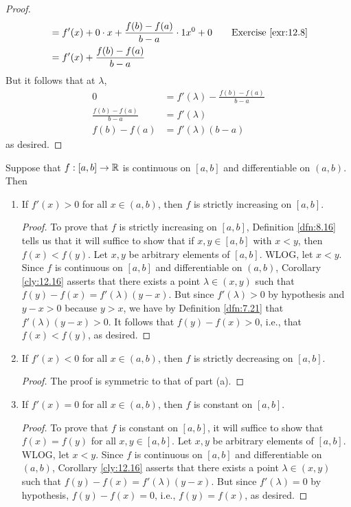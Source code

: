 \documentclass[../main.tex]{subfiles}
\begin{document}
\begin{corollary}
\begin{proof}
\begin{align*}
            &= f'(x)+0\cdot x+\frac{f(b)-f(a)}{b-a}\cdot 1x^0+0\tag*{Exercise \ref{exr:12.8}}\\
            &= f'(x)+\frac{f(b)-f(a)}{b-a}
        \end{align*}
        But it follows that at $\lambda$,
        \begin{align*}
            0 &= f'(\lambda)-\frac{f(b)-f(a)}{b-a}\\
            \frac{f(b)-f(a)}{b-a} &= f'(\lambda)\\
            f(b)-f(a) &= f'(\lambda)(b-a)
        \end{align*}
        as desired.
    \end{proof}
\end{corollary}

\begin{corollary}\label{cly:12.17}
    Suppose that $f:[a,b]\to\mathbb{R}$ is continuous on $[a,b]$ and differentiable on $(a,b)$. Then
    \begin{enumerate}[label={\textup{(}\alph*\textup{)}}]
        \item If $f'(x)>0$ for all $x\in(a,b)$, then $f$ is strictly increasing on $[a,b]$.
        \begin{proof}
            To prove that $f$ is strictly increasing on $[a,b]$, Definition \ref{dfn:8.16} tells us that it will suffice to show that if $x,y\in[a,b]$ with $x<y$, then $f(x)<f(y)$. Let $x,y$ be arbitrary elements of $[a,b]$. WLOG, let $x<y$. Since $f$ is continuous  on $[a,b]$ and differentiable on $(a,b)$, Corollary \ref{cly:12.16} asserts that there exists a point $\lambda\in(x,y)$ such that $f(y)-f(x)=f'(\lambda)(y-x)$. But since $f'(\lambda)>0$ by hypothesis and $y-x>0$ because $y>x$, we have by Definition \ref{dfn:7.21} that $f'(\lambda)(y-x)>0$. It follows that $f(y)-f(x)>0$, i.e., that $f(x)<f(y)$, as desired.
        \end{proof}
        \item If $f'(x)<0$ for all $x\in(a,b)$, then $f$ is strictly decreasing on $[a,b]$.
        \begin{proof}
            The proof is symmetric to that of part (a).
        \end{proof}
        \item If $f'(x)=0$ for all $x\in(a,b)$, then $f$ is constant on $[a,b]$.
        \begin{proof}
            To prove that $f$ is constant on $[a,b]$, it will suffice to show that $f(x)=f(y)$ for all $x,y\in[a,b]$. Let $x,y$ be arbitrary elements of $[a,b]$. WLOG, let $x<y$. Since $f$ is continuous on $[a,b]$ and differentiable on $(a,b)$, Corollary \ref{cly:12.16} asserts that there exists a point $\lambda\in(x,y)$ such that $f(y)-f(x)=f'(\lambda)(y-x)$. But since $f'(\lambda)=0$ by hypothesis, $f(y)-f(x)=0$, i.e., $f(y)=f(x)$, as desired.
        \end{proof}
    \end{enumerate}
\end{corollary}
\end{document}
